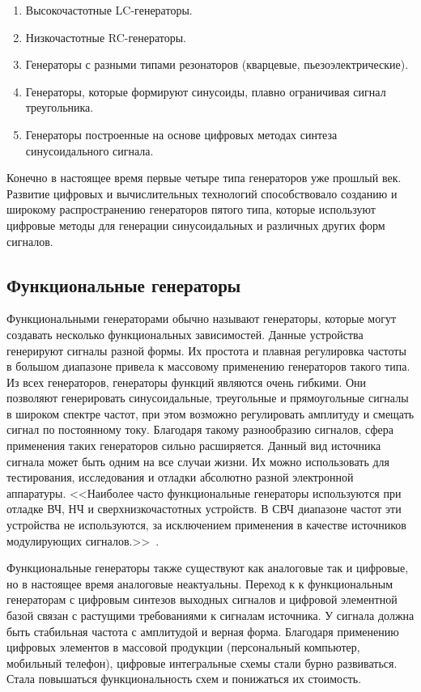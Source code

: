 \begin{enumerate}
	\item Высокочастотные LC-генераторы.
	\item Низкочастотные RC-генераторы.
	\item Генераторы с разными типами резонаторов (кварцевые, пьезоэлектрические).
	\item Генераторы, которые формируют синусоиды, плавно ограничивая сигнал треугольника.
	\item Генераторы построенные на основе цифровых методах синтеза синусоидального сигнала.
\end{enumerate}

Конечно в настоящее время первые четыре типа генераторов уже прошлый век. Развитие цифровых и вычислительных технологий способствовало созданию и широкому распространению генераторов пятого типа, которые используют цифровые методы для генерации синусоидальных и различных других форм сигналов.

\subsection*{Функциональные генераторы}
Функциональными генераторами обычно называют генераторы, которые могут создавать несколько функциональных зависимостей. Данные устройства генерируют сигналы разной формы. Их простота и плавная регулировка частоты в большом диапазоне привела к массовому применению генераторов такого типа. Из всех генераторов, генераторы функций являются очень гибкими. Они позволяют генерировать синусоидальные, треугольные и прямоугольные сигналы в широком спектре частот, при этом возможно регулировать амплитуду и смещать сигнал по постоянному току. Благодаря такому разнообразию сигналов, сфера применения таких генераторов сильно расширяется. Данный вид источника сигнала может быть одним на все случаи жизни. Их можно использовать для тестирования, исследования и отладки абсолютно разной электронной аппаратуры. <<Наиболее часто функциональные генераторы используются при отладке ВЧ, НЧ и сверхнизкочастотных устройств. В СВЧ диапазоне частот эти устройства не используются, за исключением применения в качестве источников модулирующих сигналов.>>~\cite{dgs}.

Функциональные генераторы также существуют как аналоговые так и цифровые, но в настоящее время аналоговые неактуальны. Переход к к функциональным генераторам с цифровым синтезов выходных сигналов и цифровой элементной базой связан с растущими требованиями к сигналам источника. У сигнала должна быть стабильная частота с амплитудой и верная форма. Благодаря применению цифровых элементов в массовой продукции (персональный компьютер, мобильный телефон), цифровые интегральные схемы стали бурно развиваться. Стала повышаться функциональность схем и понижаться их стоимость.



